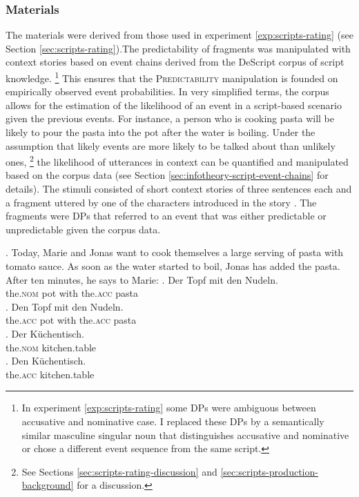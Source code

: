 \subsubsection{Materials}
The materials were derived from those used in experiment \ref{exp:scripts-rating} (see Section \ref{sec:scripts-rating}).The predictability of fragments was manipulated with context stories based on event chains derived from the DeScript \citep{wanzare.etal2016} corpus of script knowledge.%
%
\footnote{In experiment \ref{exp:scripts-rating} some DPs were ambiguous between accusative and nominative case. I replaced these DPs by a semantically similar masculine singular noun that distinguishes accusative and nominative or chose a different event sequence from the same script.}\afterfn%
%
This ensures that the \textsc{Predictability} manipulation is founded on empirically observed event probabilities. In very simplified terms, the corpus allows for the estimation of the likelihood of an event in a script-based scenario given the previous events. For instance, a person who is cooking pasta will be likely to pour the pasta into the pot after the water is boiling. Under the assumption that likely events are more likely to be talked about than unlikely ones,%
%
\footnote{See Sections \ref{sec:scripts-rating-discussion} and \ref{sec:scripts-production-background} for a discussion.}\afterfn%
%
the likelihood of utterances in context can be quantified and manipulated based on the corpus data (see Section \ref{sec:infotheory-script-event-chains} for details). The stimuli consisted of short context stories of three sentences each and a fragment uttered by one of the characters introduced in the story \Next. The fragments were DPs that referred to an event that was either predictable \Next[a,b] or unpredictable \Next[c,d] given the corpus data. 

\ex. Today, Marie and Jonas want to cook themselves a large serving of pasta with tomato sauce. As soon as the water started to boil, Jonas has added the pasta. After ten minutes, he says to Marie:
\ag. Der Topf mit den Nudeln.\\
     the.\textsc{nom} pot with the.\textsc{acc} pasta\\ 
\bg. Den Topf mit den Nudeln.\\
     the.\textsc{acc} pot with the.\textsc{acc} pasta\\
       
\cg. Der Küchentisch.\\
     the.\textsc{nom} kitchen.table\\ 
\dg. Den Küchentisch.\\
     the.\textsc{acc} kitchen.table\\
      


